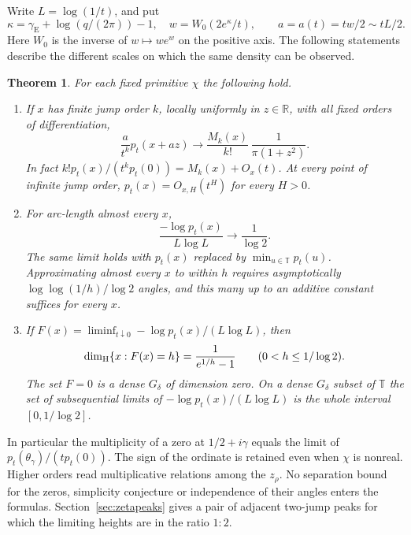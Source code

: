 \documentclass[11pt]{article}
\newtheorem{theorem}{Theorem}[section]
\theoremstyle{remark}\newtheorem{remark}[theorem]{Remark}
\newcommand{\R}{\mathbb R}\newcommand{\T}{\mathbb T}\newcommand{\Z}{\mathbb Z}\newcommand{\N}{\mathbb N}
\begin{document}
Write $L=\log(1/t)$, and put
\begin{equation}\label{eq:scale}
 \kappa=\gamma_{\mathrm E}+\log(q/(2\pi))-1,\quad
 w=W_0(2e^\kappa/t),\qquad a=a(t)=tw/2\sim tL/2 .
\end{equation}
Here $W_0$ is the inverse of $w\mapsto we^w$ on the positive axis.
The following statements describe the different scales on which the
same density can be observed.
\begin{theorem}\label{thm:summary}
For each fixed primitive $\chi$ the following hold.
\begin{enumerate}
\item If $x$ has finite jump order $k$, locally uniformly in $z\in\R$, with
all fixed orders of differentiation,
\[
 \frac{a}{t^k}p_t(x+az)\longrightarrow
 \frac{M_k(x)}{k!}\,\frac1{\pi(1+z^2)}.
\]
In fact $k!p_t(x)/(t^k p_t(0))=M_k(x)+O_x(t)$.
At every point of infinite jump order, $p_t(x)=O_{x,H}(t^H)$ for every $H>0$.
\item For arc-length almost every $x$,
\[
 \frac{-\log p_t(x)}{L\log L}\longrightarrow\frac1{\log2}.
\]
The same limit holds with $p_t(x)$ replaced by $\min_{u\in\T}p_t(u)$.
Approximating almost every $x$ to within $h$ requires asymptotically
$\log\log(1/h)/\log 2$ angles, and this many up to an additive constant
suffices for every $x$.
\item If $F(x)=\liminf_{t\downarrow0}-\log p_t(x)/(L\log L)$, then
\[
 \dim_{\rm H}\{x:F(x)=h\}=\frac{1}{e^{1/h}-1}
 \qquad (0<h\le1/\log2).
\]
The set $F=0$ is a dense $G_\delta$ of dimension zero.
On a dense $G_\delta$ subset of $\T$ the set of subsequential limits
of $-\log p_t(x)/(L\log L)$ is the whole interval $[0,1/\log 2]$.
\end{enumerate}
\end{theorem}
In particular the multiplicity of a zero at $1/2+i\gamma$ equals the limit
of $p_t(\theta_\gamma)/(t p_t(0))$. The sign of the ordinate is retained even
when $\chi$ is nonreal. Higher orders read multiplicative relations among
the $z_\rho$. No separation bound for the zeros, simplicity conjecture or
independence of their angles enters the formulas. Section~\ref{sec:zetapeaks}
gives a pair of adjacent two-jump peaks for which the limiting heights
are in the ratio $1:2$.
\end{document}
